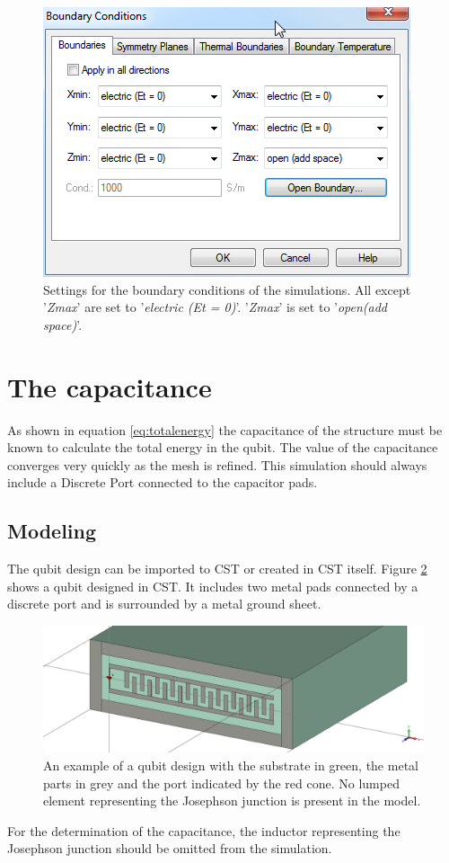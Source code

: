 \begin{figure}[h]
	\begin{center}
		\includegraphics[scale = .7]{Figures/Boundaries}
		\caption{Settings for the boundary conditions of the simulations. All except '\textit{Zmax}' are set to '\textit{electric (Et = 0)}'. '\textit{Zmax}' is set to '\textit{open(add space)}'.}
		\label{fig:Boundaries}
	\end{center}
\end{figure}

\section{The capacitance}
As shown in equation \eqref{eq:totalenergy} the capacitance of the structure must be known to calculate the total energy in the qubit. The value of the capacitance converges very quickly as the mesh is refined. This simulation should always include a Discrete Port connected to the capacitor pads.
% 
\subsection{Modeling}
The qubit design can be imported to CST or created in CST itself. Figure \ref{fig:capacitance_basic_setup} shows a qubit designed in CST. It includes two metal pads connected by a discrete port and is surrounded by a metal ground sheet. 
\begin{figure}
	\includegraphics[width=\textwidth]{Figures/capacitance_basic_setup}
	\caption{An example of a qubit design with the substrate in green, the metal parts in grey and the port indicated by the red cone. No lumped element representing the Josephson junction is present in the model.}
	\label{fig:capacitance_basic_setup}
\end{figure}
For the determination of the capacitance, the inductor representing the Josephson junction should be omitted from the simulation.
